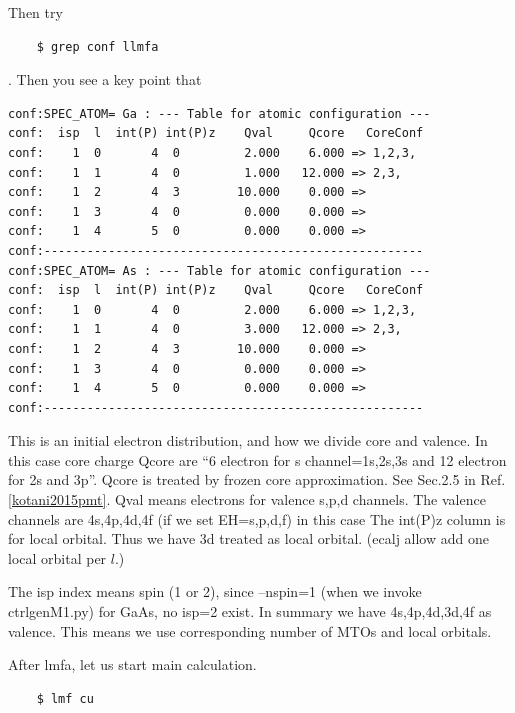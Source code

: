 Then try
\begin{verbatim}
    $ grep conf llmfa
\end{verbatim}
. Then you see a key point that
\begin{verbatim}
conf:SPEC_ATOM= Ga : --- Table for atomic configuration ---
conf:  isp  l  int(P) int(P)z    Qval     Qcore   CoreConf
conf:    1  0       4  0         2.000    6.000 => 1,2,3,
conf:    1  1       4  0         1.000   12.000 => 2,3,
conf:    1  2       4  3        10.000    0.000 => 
conf:    1  3       4  0         0.000    0.000 => 
conf:    1  4       5  0         0.000    0.000 => 
conf:-----------------------------------------------------
conf:SPEC_ATOM= As : --- Table for atomic configuration ---
conf:  isp  l  int(P) int(P)z    Qval     Qcore   CoreConf
conf:    1  0       4  0         2.000    6.000 => 1,2,3,
conf:    1  1       4  0         3.000   12.000 => 2,3,
conf:    1  2       4  3        10.000    0.000 => 
conf:    1  3       4  0         0.000    0.000 => 
conf:    1  4       5  0         0.000    0.000 => 
conf:-----------------------------------------------------
\end{verbatim}
This is an initial electron distribution, and how we divide 
core and valence. 
In this case core charge Qcore are ``6 electron for s channel=1s,2s,3s
and 12 electron for 2s and 3p''. 
Qcore is treated by frozen core approximation.
See Sec.2.5 in Ref.\ref{kotani2015pmt}.
Qval means electrons for valence s,p,d channels.
The valence channels are 4s,4p,4d,4f (if we set EH=s,p,d,f) in this case
The int(P)z column is for local orbital. Thus we have 3d treated as
local orbital. (ecalj allow add one local orbital per $l$.)

The isp index means spin (1 or 2), 
since --nspin=1 (when we invoke ctrlgenM1.py) for GaAs, no isp=2 exist.
In summary we have 4s,4p,4d,3d,4f as valence. 
This means we use corresponding number of MTOs and local orbitals.

After lmfa, let us start main calculation.
\begin{verbatim}
    $ lmf cu
\end{verbatim}

